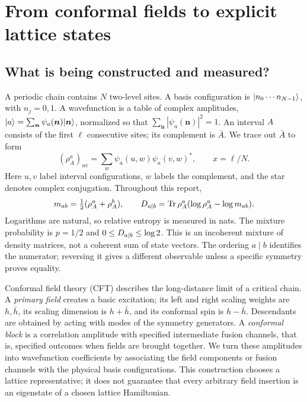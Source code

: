 \section{From conformal fields to explicit lattice states}
\label{sec:construction}
\subsection{What is being constructed and measured?}
A periodic chain contains $N$ two-level sites. A basis configuration is
$\lvert n_0\cdots n_{N-1}\rangle$, with $n_j=0,1$. A wavefunction is a table of
complex amplitudes, $\lvert a\rangle=\sum_{\bm n}\psi_a(\bm n)\lvert \bm n\rangle$,
normalized so that $\sum_{\bm n}|\psi_a(\bm n)|^2=1$.
An interval $A$ consists of the first $\ell$ consecutive sites; its complement
is $\bar A$. We trace out $\bar A$ to form
\begin{equation}
 (\rho_A^a)_{uv}=\sum_w\psi_a(u,w)\psi_a(v,w)^*,\qquad x=\ell/N.
 \label{eq:rdm}
\end{equation}
Here $u,v$ label interval configurations, $w$ labels the complement, and
the star denotes complex conjugation. Throughout this report,
\begin{equation}
 m_{ab}=\tfrac12(\rho_A^a+\rho_A^b),\qquad
 D_{a\mid b}=\operatorname{Tr}\rho_A^a(\log\rho_A^a-\log m_{ab}).
 \label{eq:observable}
\end{equation}
Logarithms are natural, so relative entropy is measured in nats. The
mixture probability is $p=1/2$ and $0\leq D_{a\mid b}\leq\log2$. This is an
incoherent mixture of density matrices, not a coherent sum of state vectors.
The ordering $a\mid b$ identifies the numerator; reversing it gives a
different observable unless a specific symmetry proves equality.

Conformal field theory (CFT) describes the long-distance limit of a critical
chain. A \emph{primary field} creates a basic excitation; its left and right
scaling weights are $h,\bar h$, its scaling dimension is $h+\bar h$, and its
conformal spin is $h-\bar h$. Descendants are obtained by acting with modes
of the symmetry generators. A \emph{conformal block} is a correlation
amplitude with specified intermediate fusion channels, that is, specified
outcomes when fields are brought together. We turn these amplitudes into
wavefunction coefficients by associating the field components or fusion
channels with the physical basis configurations. This construction chooses
a lattice representative; it does not guarantee that every arbitrary field
insertion is an eigenstate of a chosen lattice Hamiltonian.

